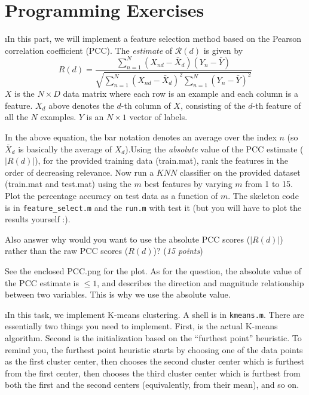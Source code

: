 \documentclass[fleqn]{article}
\begin{document}
\ene

\section{Programming Exercises}

\bee

\i In this part, we will implement a feature selection method based on
the Pearson correlation coefficient (PCC). The \textit{estimate} of 
$\mathcal{R}(d)$ is given by
\[
  R(d) = \frac{\sum_{n=1}^N (X_{nd} - \bar{X}_{d})(Y_n - \bar{Y})}
  {\sqrt{\sum_{n=1}^N (X_{nd} - \bar{X}_{d})^2\sum_{n=1}^N(Y_n - \bar{Y})^2}}
\]
$X$ is the $N\times D$ data matrix where each row is an example and each
column is a feature. $X_d$ above denotes the $d$-th column of $X$, consisting
of the $d$-th feature of all the $N$ examples. $Y$ is an $N\times 1$ vector
of labels.

In the above equation, the bar notation denotes an average over the index $n$
(so $\bar{X}_{d}$ is basically the average of $X_d$).Using the \textit{absolute} 
value of the PCC estimate ($|R(d)|$), for the provided training data (train.mat), rank the features in 
the order of decreasing relevance. Now run a $KNN$ classifier on the provided dataset
(train.mat and test.mat) using the $m$ best features by varying $m$ from 1 to 15. 
Plot the percentage accuracy on test data as a function of $m$. The skeleton code is 
in \texttt{feature\_select.m} and the \texttt{run.m} with test it (but you will have to 
plot the results yourself :). 

Also answer why would you want to use the absolute PCC scores ($|R(d)|$) rather than the 
raw PCC scores ($R(d)$)? (\textit{15 points}) 

\begin{solution}
See the enclosed PCC.png for the plot. As for the question, the absolute value of the PCC estimate is $\le 1$, and describes the direction and magnitude relationship between two variables. This is why we use the absolute value.
\end{solution}

\i In this task, we implement K-means clustering. A shell is in \texttt{kmeans.m}. 
There are essentially two things you need to implement. First, is the actual 
K-means algorithm. Second is the initialization based on the ``furthest point'' 
heuristic. To remind you, the furthest point heuristic starts by
choosing one of the data points as the first cluster center, then chooses the
second cluster center which is furthest from the first center, then chooses 
the third cluster center which is furthest from both the first and the second 
centers (equivalently, from their mean), and so on.
\end{document}
